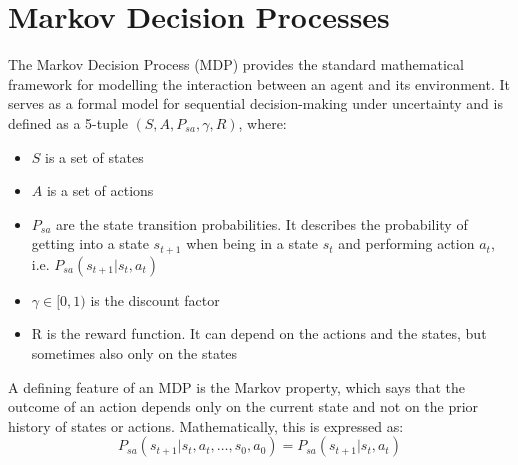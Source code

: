\section{Markov Decision Processes}\label{MDP}
The Markov Decision Process (MDP) provides the standard mathematical framework for modelling the interaction 
between an agent and its environment. It serves as a formal model for sequential decision-making under 
uncertainty and is defined as a 5-tuple $(S, A, P_{sa}, \gamma, R)$, where:

\begin{itemize}
    \item $S$ is a set of states
    \item $A$ is a set of actions
    \item $P_{sa}$ are the state transition probabilities. It describes the probability of getting into a state $s_{t+1}$ when being in a state $s_t$ and performing action $a_t$, i.e. $P_{sa}(s_{t+1}|s_t,a_t)$
    \item $\gamma \in [0,1)$ is the discount factor 
    \item R is the reward function. It can depend on the actions and the states, but sometimes also only on the states
\end{itemize}
A defining feature of an MDP is the Markov property, which says that the outcome of an action depends only on 
the current state and not on the prior history of states or actions. Mathematically, this is expressed as:
\begin{equation*}
    P_{sa}(s_{t+1}|s_t,a_t,\dots,s_0,a_0) = P_{sa}(s_{t+1}|s_t,a_t)
\end{equation*}



